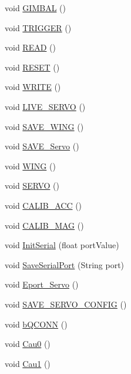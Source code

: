 \begin{DoxyCompactItemize}
void \hyperlink{classMultiWiiConf_a5157e3fae162d740189e25adca5dad1e}{G\-I\-M\-B\-A\-L} ()
\item 
void \hyperlink{classMultiWiiConf_a7707921bbef91c191fcf7b9b57707c7b}{T\-R\-I\-G\-G\-E\-R} ()
\item 
void \hyperlink{classMultiWiiConf_a2c5626b2259e329d5501da2609875c19}{R\-E\-A\-D} ()
\item 
void \hyperlink{classMultiWiiConf_a51b5f517a679dd129e8226cdfbd1d052}{R\-E\-S\-E\-T} ()
\item 
void \hyperlink{classMultiWiiConf_a3de7c01db79331e4ae6d75ddab9eedcc}{W\-R\-I\-T\-E} ()
\item 
void \hyperlink{classMultiWiiConf_aea8b2d0db9fb1ba3c1f83bf339e13573}{L\-I\-V\-E\-\_\-\-S\-E\-R\-V\-O} ()
\item 
void \hyperlink{classMultiWiiConf_acc41b4d048f1bafd56534ed2b69ff790}{S\-A\-V\-E\-\_\-\-W\-I\-N\-G} ()
\item 
void \hyperlink{classMultiWiiConf_aff39ce24b10a21b47f19007bc1548463}{S\-A\-V\-E\-\_\-\-Servo} ()
\item 
void \hyperlink{classMultiWiiConf_a56dbe3488934b1cd45fe8d85f810383a}{W\-I\-N\-G} ()
\item 
void \hyperlink{classMultiWiiConf_a86f14ce1d6f3832a8566674b79439a29}{S\-E\-R\-V\-O} ()
\item 
void \hyperlink{classMultiWiiConf_afcaa86ab6487c949b55d21a09233cd6d}{C\-A\-L\-I\-B\-\_\-\-A\-C\-C} ()
\item 
void \hyperlink{classMultiWiiConf_a53f8586a159a0771380e69bf2fe4a03d}{C\-A\-L\-I\-B\-\_\-\-M\-A\-G} ()
\item 
void \hyperlink{classMultiWiiConf_ad3b31ce5a10521c304a47aee0b63035f}{Init\-Serial} (float port\-Value)
\item 
void \hyperlink{classMultiWiiConf_ad0685ad60f2ab83d769fee5aaa597950}{Save\-Serial\-Port} (String port)
\item 
void \hyperlink{classMultiWiiConf_a42a4b3766358fb85ef2da8be3cff0b85}{Eport\-\_\-\-Servo} ()
\item 
void \hyperlink{classMultiWiiConf_accbc975f7d37014059827e3cd9e8f787}{S\-A\-V\-E\-\_\-\-S\-E\-R\-V\-O\-\_\-\-C\-O\-N\-F\-I\-G} ()
\item 
void \hyperlink{classMultiWiiConf_ac97009142868c50faca724fb1e138ea1}{b\-Q\-C\-O\-N\-N} ()
\item 
void \hyperlink{classMultiWiiConf_af7c440cc4348b741e7c0129912ab02b6}{Cau0} ()
\item 
void \hyperlink{classMultiWiiConf_aed32c4524c48488a9cb7996bf18f87c2}{Cau1} ()

\end{DoxyCompactItemize}
